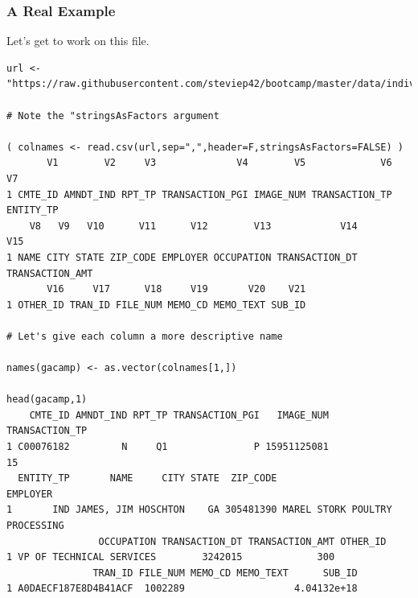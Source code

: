 \documentclass{beamer}
\begin{document}
\begin{frame}[fragile]
\frametitle{A Real Example}Let's get to work on this file.
\tiny
\begin{verbatim}
url <- "https://raw.githubusercontent.com/steviep42/bootcamp/master/data/indiv_header_file.csv"

# Note the "stringsAsFactors argument

( colnames <- read.csv(url,sep=",",header=F,stringsAsFactors=FALSE) )
       V1        V2     V3              V4        V5             V6        V7
1 CMTE_ID AMNDT_IND RPT_TP TRANSACTION_PGI IMAGE_NUM TRANSACTION_TP ENTITY_TP
    V8   V9   V10      V11      V12        V13            V14             V15
1 NAME CITY STATE ZIP_CODE EMPLOYER OCCUPATION TRANSACTION_DT TRANSACTION_AMT
       V16     V17      V18     V19       V20    V21
1 OTHER_ID TRAN_ID FILE_NUM MEMO_CD MEMO_TEXT SUB_ID

# Let's give each column a more descriptive name

names(gacamp) <- as.vector(colnames[1,])

head(gacamp,1)
    CMTE_ID AMNDT_IND RPT_TP TRANSACTION_PGI   IMAGE_NUM TRANSACTION_TP
1 C00076182         N     Q1               P 15951125081             15
  ENTITY_TP       NAME     CITY STATE  ZIP_CODE                       EMPLOYER
1       IND JAMES, JIM HOSCHTON    GA 305481390 MAREL STORK POULTRY PROCESSING
                OCCUPATION TRANSACTION_DT TRANSACTION_AMT OTHER_ID
1 VP OF TECHNICAL SERVICES        3242015             300         
               TRAN_ID FILE_NUM MEMO_CD MEMO_TEXT      SUB_ID
1 A0DAECF187E8D4B41ACF  1002289                   4.04132e+18

\end{verbatim}
\end{frame}

%
\end{document}
